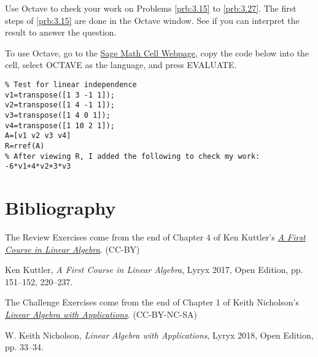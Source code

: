 \documentclass{ximera}
\begin{document}
\begin{problem}\label{oct:lindep}
Use Octave to check your work on Problems \ref{prb:3.15} to \ref{prb:3.27}.  The first steps of \ref{prb:3.15} are done in the Octave window.  See if you can interpret the result to answer the question.

To use Octave, go to the \href{https://sagecell.sagemath.org/}{Sage Math Cell Webpage}, copy the code below into the cell, select OCTAVE as the language, and press EVALUATE.

\begin{verbatim}
% Test for linear independence
v1=transpose([1 3 -1 1]);
v2=transpose([1 4 -1 1]);
v3=transpose([1 4 0 1]);
v4=transpose([1 10 2 1]);
A=[v1 v2 v3 v4]
R=rref(A)
% After viewing R, I added the following to check my work: 
-6*v1+4*v2+3*v3
\end{verbatim}
\end{problem}

\section*{Bibliography}
The Review Exercises come from the end of Chapter 4 of Ken Kuttler's \href{https://open.umn.edu/opentextbooks/textbooks/a-first-course-in-linear-algebra-2017}{\it A First Course in Linear Algebra}. (CC-BY)

Ken Kuttler, {\it  A First Course in Linear Algebra}, Lyryx 2017, Open Edition, pp. 151--152, 220--237. 

The Challenge Exercises come from the end of Chapter 1 of Keith Nicholson's \href{https://open.umn.edu/opentextbooks/textbooks/linear-algebra-with-applications}{\it Linear Algebra with Applications}. (CC-BY-NC-SA)

W. Keith Nicholson, {\it Linear Algebra with Applications}, Lyryx 2018, Open Edition, pp. 33--34. 
\end{document}
